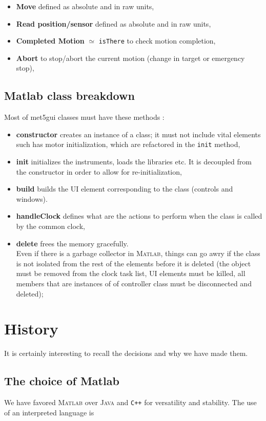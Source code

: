 \documentclass[10pt,letter,twoside]{report}
\begin{document}
			\begin{itemize}
			\item \textbf{Move} defined as absolute and in raw units,
			\item \textbf{Read position/sensor} defined as absolute and in raw units,
			\item \textbf{Completed Motion} $\simeq$ \verb!isThere! to check motion completion,
			\item \textbf{Abort} to stop/abort the current motion (change in target or emergency stop),			
			\end{itemize}

			
			\subsection{Matlab class breakdown}
			Most of met5gui classes must have these methods :
			\begin{itemize}
			\item \textbf{constructor}
			creates an instance of a class; it must not include vital elements such has motor initialization, which are refactored in the \verb!init! method,
			\item \textbf{init}
			initializes the instruments, loads the libraries etc. It is decoupled from the constructor in order to allow for re-initialization,
			\item \textbf{build}
			builds the UI element corresponding to the class (controls and windows).
			\item \textbf{handleClock}
			defines what are the actions to perform when the class is called by the common clock,
			\item \textbf{delete}
			frees the memory gracefully.\\
			Even if there is a garbage collector in \textsc{Matlab}, things can go awry if the class is not isolated from the rest of the elements before it is deleted (the object must be removed from the clock task list, UI elements must be killed, all members that are instances of of controller class must be disconnected and deleted);			
			\end{itemize}
	
\section{History}
It is certainly interesting to recall the decisions and why we have made them.
\subsection{The choice of Matlab}
We have favored \textsc{Matlab} over \textsc{Java} and \verb!C++! for versatility and stability.
The use of an interpreted language is 
\end{document}
